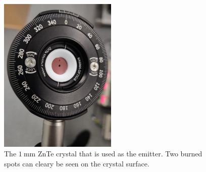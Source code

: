 \begin{figure}
    \centering
    \includegraphics[width=0.5\textwidth]{Plots/burned_crystal.jpeg}
    \caption{The $\SI{1}{\milli\meter}$ ZnTe crystal that is used as the emitter.
    Two burned spots can cleary be seen on the crystal surface.}
    \label{fig:ZnTe_burned}
\end{figure}